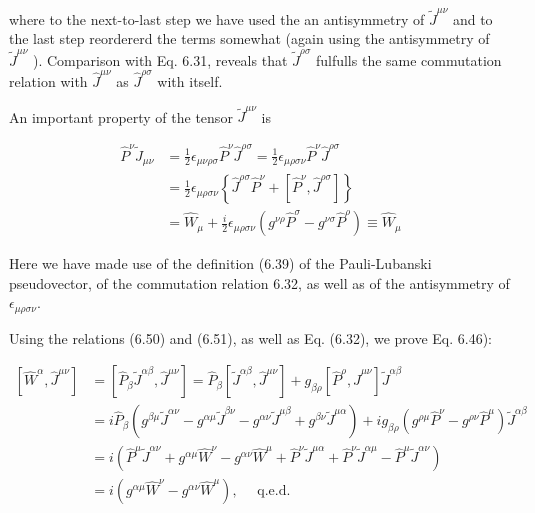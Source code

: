 \documentclass[10pt, letterpaper]{article}
\begin{document}
where to the next-to-last step we have used the an antisymmetry of $\tilde{J}^{\mu \nu}$ and to the last step reordererd the terms somewhat (again using the antisymmetry of $\tilde{J}^{\mu \nu}$ ). Comparison with Eq. 6.31, reveals that $\tilde{J}^{\rho \sigma}$ fulfulls the same commutation relation with $\hat{J}^{\mu \nu}$ as $\hat{J}^{\rho \sigma}$ with itself.

An important property of the tensor $\tilde{J}^{\mu \nu}$ is

$$
\begin{aligned}
\hat{P}^{\nu} \tilde{J}_{\mu \nu} & =\frac{1}{2} \epsilon_{\mu \nu \rho \sigma} \hat{P}^{\nu} \hat{J}^{\rho \sigma}=\frac{1}{2} \epsilon_{\mu \rho \sigma \nu} \hat{P}^{\nu} \hat{J}^{\rho \sigma} \\
& =\frac{1}{2} \epsilon_{\mu \rho \sigma \nu}\left\{\hat{J}^{\rho \sigma} \hat{P}^{\nu}+\left[\hat{P}^{\nu}, \hat{J}^{\rho \sigma}\right]\right\} \\
& =\hat{W}_{\mu}+\frac{i}{2} \epsilon_{\mu \rho \sigma \nu}\left(g^{\nu \rho} \hat{P}^{\sigma}-g^{\nu \sigma} \hat{P}^{\rho}\right) \equiv \hat{W}_{\mu}
\end{aligned}
$$

Here we have made use of the definition (6.39) of the Pauli-Lubanski pseudovector, of the commutation relation 6.32, as well as of the antisymmetry of $\epsilon_{\mu \rho \sigma \nu}$.

Using the relations (6.50) and (6.51), as well as Eq. (6.32), we prove Eq. 6.46):

$$
\begin{aligned}
{\left[\hat{W}^{\alpha}, \hat{J}^{\mu \nu}\right] } & =\left[\hat{P}_{\beta} \tilde{J}^{\alpha \beta}, \hat{J}^{\mu \nu}\right]=\hat{P}_{\beta}\left[\tilde{J}^{\alpha \beta}, \hat{J}^{\mu \nu}\right]+g_{\beta \rho}\left[\hat{P}^{\rho}, \hat{J}^{\mu \nu}\right] \tilde{J}^{\alpha \beta} \\
& =i \hat{P}_{\beta}\left(g^{\beta \mu} \tilde{J}^{\alpha \nu}-g^{\alpha \mu} \tilde{J}^{\beta \nu}-g^{\alpha \nu} \tilde{J}^{\mu \beta}+g^{\beta \nu} \tilde{J}^{\mu \alpha}\right)+i g_{\beta \rho}\left(g^{\rho \mu} \hat{P}^{\nu}-g^{\rho \nu} \hat{P}^{\mu}\right) \tilde{J}^{\alpha \beta} \\
& =i\left(\hat{P}^{\mu} \tilde{J}^{\alpha \nu}+g^{\alpha \mu} \hat{W}^{\nu}-g^{\alpha \nu} \hat{W}^{\mu}+\hat{P}^{\nu} \tilde{J}^{\mu \alpha}+\hat{P}^{\nu} \tilde{J}^{\alpha \mu}-\hat{P}^{\mu} \tilde{J}^{\alpha \nu}\right) \\
& =i\left(g^{\alpha \mu} \hat{W}^{\nu}-g^{\alpha \nu} \hat{W}^{\mu}\right), \quad \text { q.e.d. }
\end{aligned}
$$
\end{document}
